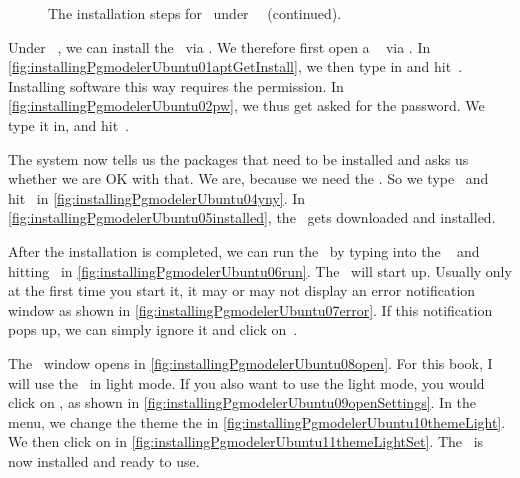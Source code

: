 \begin{figure}%
\ContinuedFloat%
\centering%
%
%
%
\floatRowSep%
%
%
%
\floatRowSep%
%
%
%
\floatSep%
%
%
%
\caption{The installation steps for \pgmodeler\ under \ubuntu\ \linux~(continued).}%
\label{fig:installingPgmodelerUbuntu:C}%
\end{figure}%
%
Under \ubuntu\ \linux, we can install the \pgmodeler\ via .
We therefore first open a \bash\  via \ubuntuTerminal.
In \cref{fig:installingPgmodelerUbuntu01aptGetInstall}, we then type in  and hit~\keys{\return}.
Installing software this way requires the  permission.
In \cref{fig:installingPgmodelerUbuntu02pw}, we thus get asked for the  password.
We type it in, and hit~\keys{\return}.

The system now tells us the packages that need to be installed and asks us whether we are OK with that.
We are, because we need the \pgmodeler.
So we type~ and hit~\keys{\return} in \cref{fig:installingPgmodelerUbuntu04yny}.%
In \cref{fig:installingPgmodelerUbuntu05installed}, the \pgmodeler\ gets downloaded and installed.

After the installation is completed, we can run the \pgmodeler\ by typing  into the \bash\  and hitting~\keys{\return} in \cref{fig:installingPgmodelerUbuntu06run}.
The \pgmodeler\ will start up.
Usually only at the first time you start it, it may or may not display an error notification window as shown in \cref{fig:installingPgmodelerUbuntu07error}.
If this notification pops up, we can simply ignore it and click on~.

The \pgmodeler\ window opens in \cref{fig:installingPgmodelerUbuntu08open}.
For this book, I will use the \pgmodeler\ in light mode.
If you also want to use the light mode, you would click on , as shown in \cref{fig:installingPgmodelerUbuntu09openSettings}.
In the  menu, we change the theme the  in \cref{fig:installingPgmodelerUbuntu10themeLight}.
We then click on  in \cref{fig:installingPgmodelerUbuntu11themeLightSet}.
The \pgmodeler\ is now installed and ready to use.%
\FloatBarrier%
\endhsection%
%

